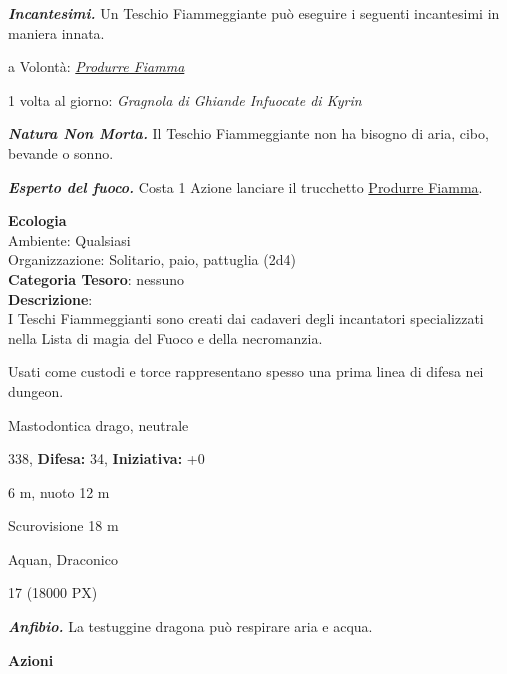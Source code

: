 \begin{multicols}{2}
{\emph{\textbf{Incantesimi.}} Un Teschio Fiammeggiante può eseguire i seguenti incantesimi in maniera innata.

a Volontà: \emph{\hyperlink{Produrre Fiamma}{Produrre Fiamma}}

1 volta al giorno: \emph{Gragnola di Ghiande Infuocate di Kyrin}

\emph{\textbf{Natura Non Morta.}} Il Teschio Fiammeggiante non ha bisogno di aria, cibo, bevande o sonno.

\emph{\textbf{Esperto del fuoco.}} Costa 1 Azione lanciare il trucchetto \hyperlink{Produrre Fiamma}{Produrre Fiamma}.

\textbf{Ecologia}\\
Ambiente: Qualsiasi\\
Organizzazione: Solitario, paio, pattuglia (2d4)\\
\textbf{Categoria Tesoro}: nessuno\\
\textbf{Descrizione}:\\
I Teschi Fiammeggianti sono creati dai cadaveri degli incantatori specializzati nella Lista di magia del Fuoco e della necromanzia.

Usati come custodi e torce rappresentano spesso una prima linea di difesa nei dungeon.

\noindent
\begin{description}[noitemsep, topsep=0pt, parsep=0pt, partopsep=0pt, leftmargin=0cm, labelwidth=2.2cm]
	\item[\textbf{Taglia/Tipo:}] Mastodontica drago, neutrale
	\item[\textbf{Caratt.:}] 
	\item[\textbf{Punti Ferita:}] 338,  \textbf{Difesa:} 34,  \textbf{Iniziativa:} +0
	\item[\textbf{Movimento:}] 6 m, nuoto 12 m
	\item[\textbf{Tiri Salvez.:}] 
	\item[\textbf{Sensi:}] Scurovisione 18 m
	\item[\textbf{Linguaggi:}] Aquan, Draconico
	\item[\textbf{Sfida:}] 17 (18000 PX)\smallskip
\end{description}

\emph{\textbf{Anfibio.}} La testuggine dragona può respirare aria e acqua.

\textbf{Azioni}

}
\end{multicols}
